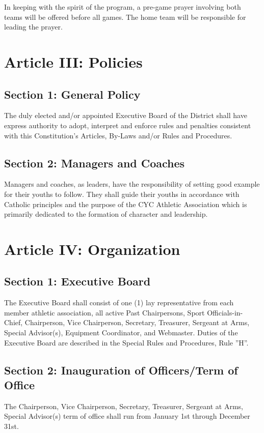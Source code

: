 \documentclass[letteraper,10pt,oneside,draft]{memoir}
\begin{document}
In keeping with the spirit of the program, a pre-game prayer involving both teams will be offered before all games. The home team will be responsible for leading the prayer.

\section[Article III: Policies]{Article III: Policies}
\subsection{Section 1: General Policy}
The duly elected and/or appointed Executive Board of the District shall have express authority to adopt, interpret and enforce rules and penalties consistent with this Constitution’s Articles, By-Laws and/or Rules and Procedures.

\subsection{Section 2: Managers and Coaches}
Managers and coaches, as leaders, have the responsibility of setting good example for their youths to follow.  They  shall guide their youths in accordance with Catholic principles and the purpose of the CYC Athletic Association  which is primarily dedicated to the formation of character and leadership.

\section{Article IV: Organization}
\subsection{Section 1: Executive Board}
The Executive Board shall consist of one (1) lay representative from each member athletic association, all active Past Chairpersons, Sport Officials-in-Chief, Chairperson, Vice Chairperson, Secretary, Treasurer, Sergeant at Arms, Special Advisor(s), Equipment Coordinator, and Webmaster.  Duties of the Executive Board are described in the Special Rules and Procedures, Rule ”H”.

\subsection{Section 2: Inauguration of Officers/Term of Office}
The Chairperson, Vice Chairperson, Secretary, Treasurer, Sergeant at Arms, Special Advisor(s) term of office shall run from January 1st through December 31st.  
\end{document}
